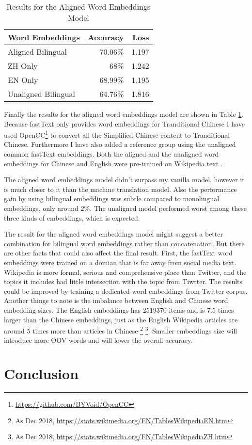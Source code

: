 \documentclass[11pt,a4paper]{article}
\begin{document}
\begin{table}[t]
  \begin{center}
  \begin{tabular}{|l|r|r|}
  \hline \bf Word Embeddings & \bf Accuracy & \bf Loss \\ \hline
  Aligned Bilingual & 70.06\% & 1.197 \\
  \hspace{0.5cm} ZH Only & 68\% & 1.242 \\
  \hspace{0.5cm} EN Only & 68.99\% & 1.195 \\
  Unaligned Bilingual & 64.76\% & 1.816 \\
  \hline
  \end{tabular}
  \end{center}
  \caption{\label{tab:cnn-results-table} Results for the Aligned Word Embeddings Model}
\end{table}

Finally the results for the aligned word embeddings model are shown in Table \ref{tab:cnn-results-table}. Because fastText only provides word embeddings for Tranditional Chinese I have used OpenCC\footnote{\url{https://github.com/BYVoid/OpenCC}} to convert all the Simplified Chinese content to Tranditional Chinese. Furthermore I have also added a reference group using the unaligned common fastText embeddings. Both the aligned and the unaligned word embeddings for Chinese and English were pre-trained on Wikipedia text \cite{bojanowski2017enriching}.

The aligned word embeddings model didn't surpass my vanilla model, however it is much closer to it than the machine translation model. Also the performance gain by using bilingual embeddings was subtle compared to monolingual embeddings, only around 2\%. The unaligned model performed worst among these three kinds of embeddings, which is expected.

The result for the aligned word embeddings model might suggest a better combination for bilingual word embeddings rather than concatenation. But there are other facts that could also affect the final result. First, the fastText word embeddings were trained on a domian that is far away from social media text. Wikipedia is more formal, serious and comprehensive place than Twitter, and the topics it includes had little intersection with the topic from Tiwtter. The results could be improved by training a dedicated word embeddings from Twitter corpus. Another things to note is the imbalance between English and Chinese word embedding sizes. The English embeddings has 2519370 items and is 7.5 times larger than the Chinese embeddings, just as the English Wikipedia articles are around 5 times more than articles in Chinese \footnote{As Dec 2018, \url{https://stats.wikimedia.org/EN/TablesWikipediaEN.htm}} \footnote{As Dec 2018, \url{https://stats.wikimedia.org/EN/TablesWikipediaZH.htm}}. Smaller embeddings size will introduce more OOV words and will lower the overall accuracy.

\section{Conclusion}



\end{document}
